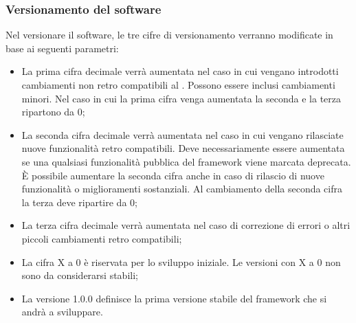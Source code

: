 \subsubsection{Versionamento del software}
\label{6.2}
Nel versionare il software, le tre cifre di versionamento verranno modificate in base ai seguenti parametri:
\begin{itemize}
\item La prima cifra decimale verrà aumentata nel caso in cui vengano introdotti cambiamenti non retro compatibili al . Possono essere inclusi cambiamenti minori. Nel caso in cui la prima cifra venga aumentata la seconda e la terza ripartono da 0;
\item La seconda cifra decimale verrà aumentata nel caso in cui vengano rilasciate nuove funzionalità retro compatibili. Deve necessariamente essere aumentata se una qualsiasi funzionalità pubblica del framework viene marcata deprecata. È possibile aumentare la seconda cifra anche in caso di rilascio di nuove funzionalità o miglioramenti sostanziali. Al cambiamento della seconda cifra la terza deve ripartire da 0;
\item La terza cifra decimale verrà aumentata nel caso di correzione di errori o altri piccoli cambiamenti retro compatibili;
\item La cifra X a 0 è riservata per lo sviluppo iniziale. Le versioni con X a 0 non sono da considerarsi stabili;
\item La versione 1.0.0 definisce la prima versione stabile del framework che si andrà a sviluppare.
\end{itemize}


